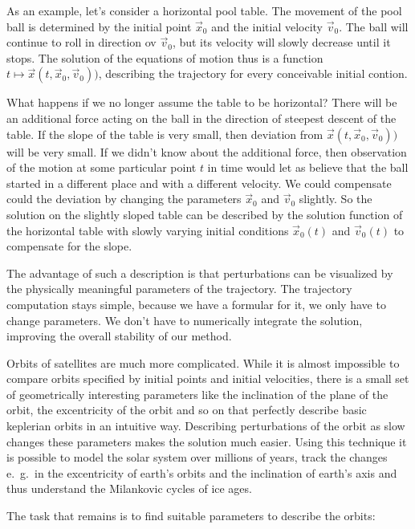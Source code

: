 \begin{beispiel}
As an example, let's consider a horizontal pool table.
The movement of the pool ball is determined by the initial
point $\vec{x}_0$ and the initial velocity $\vec{v}_0$.
The ball will continue to roll in direction ov $\vec{v}_0$, but
its velocity will slowly decrease until it stops.
The solution of the equations of motion thus is a function
$t\mapsto \vec x(t, \vec x_0, \vec v_0))$,
describing the trajectory for every conceivable initial contion.

What happens if we no longer assume the table to be horizontal?
There will be an additional force acting on the ball in the
direction of steepest descent of the table.
If the slope of the table is very small, then deviation from
$\vec x(t,\vec x_0,\vec v_0))$ will be very small.
If we didn't know about the additional force, then observation
of the motion at some particular point $t$ in time would let
as believe that the ball started in a different place and with
a different velocity.
We could compensate could the deviation by changing the parameters
$\vec x_0$ and $\vec v_0$ slightly.
So the solution on the slightly sloped table can be described by the
solution function of the horizontal table with slowly varying
initial conditions $\vec x_0(t)$ and $\vec v_0(t)$ to compensate
for the slope.
\end{beispiel}

The advantage of such a description is that perturbations can
be visualized by the physically meaningful parameters of the
trajectory.
The trajectory computation stays simple, because we have a
formular for it, we only have to change parameters.
We don't have to numerically integrate the solution, improving
the overall stability of our method.

Orbits of satellites are much more complicated.
While it is almost impossible to compare orbits specified
by initial points and initial velocities, there is a small set
of geometrically interesting parameters like the inclination of
the plane of the orbit, the excentricity of the orbit and so on
that perfectly describe basic keplerian orbits in an intuitive way.
Describing perturbations of the orbit as slow changes these
parameters makes the solution much easier.
Using this technique it is possible to model the solar system
over millions of years, track the changes e.~g.~in the excentricity
of earth's orbits and the inclination of earth's axis and thus
understand the Milankovic cycles of ice ages.

The task that remains is to find suitable parameters to describe
the orbits:

